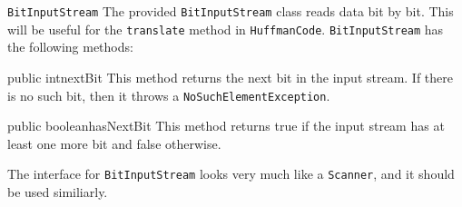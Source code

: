 \documentclass[programming]{../../mfcs}
\begin{document}
\vspace{-0.5em}

\begin{question}{\texttt{BitInputStream}}
The provided \texttt{BitInputStream} class reads data bit by bit.  This will be useful for
the \texttt{translate} method in \texttt{HuffmanCode}.  \texttt{BitInputStream} has the
following methods:

\begin{method}{public int}{nextBit}{}
    This method returns the next bit in the input stream.  If there is no such bit, then it
    throws a \texttt{NoSuchElementException}.
\end{method}

\begin{method}{public boolean}{hasNextBit}{}
    This method returns true if the input stream has at least one more bit and false
    otherwise.
\end{method}

The interface for \texttt{BitInputStream} looks very much like a \texttt{Scanner}, and it
should be used similiarly.
\end{question}
\end{document}
